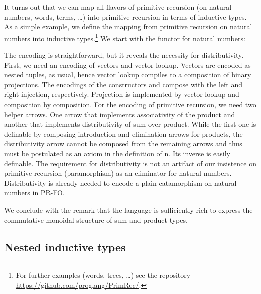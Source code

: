 \documentclass[a4paper,USenglish,cleveref, autoref, thm-restate]{lipics-v2021}
\begin{document}
It turns out that we can map all flavors of primitive recursion (on
natural numbers, words, terms, \dots) into primitive recursion in terms
of inductive types.
As a simple example, we define the mapping from primitive recursion on
natural numbers into inductive types.\footnote{For further examples
  (words, trees, \dots)
  see the repository \url{https://github.com/proglang/PrimRec/}.} We
start with the functor {\AGNat} for natural numbers:
\ccDefGNat

The encoding is straightforward, but it reveals the necessity for
distributivity. First, we need an 
encoding of vectors and vector lookup. Vectors are encoded as nested
tuples, as usual, hence vector lookup compiles to a composition of
binary projections.
\ccFunMkvec
\ccDefNatToInd
The encodings of the constructors {\ACZ} and {\ACS} compose {\Afold} with the left and right
injection, respectively. Projection is implemented by vector lookup
and composition by composition. For
the encoding of primitive recursion, we need two helper arrows. One
arrow that implements associativity of the product and another that
implements distributivity of sum over product. While the first one is
definable by composing introduction and elimination arrows for
products,  the distributivity arrow cannot be composed from the
remaining arrows and thus must be postulated as an axiom in the
definition of {\APR n}. Its inverse is easily definable.
\ccFunAssocDist
The requirement for distributivity is not an artifact of our
insistence on primitive recursion (paramorphism) as an eliminator for
natural numbers. Distributivity is already needed to encode a plain
catamorphism on natural numbers in PR-FO.

We conclude with the remark that the language is sufficiently rich to
express the commutative monoidal structure of sum and product types.

\subsection{Nested inductive types}
\label{sec:closer-look-at}
\end{document}
